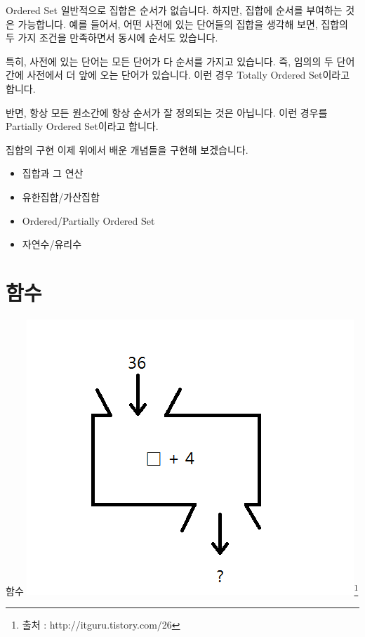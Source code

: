 \documentclass{beamer}
\begin{document}
\begin{frame}{Ordered Set}
일반적으로 집합은 순서가 없습니다. 하지만, 집합에 순서를 부여하는 것은 가능합니다. 예를 들어서, 어떤 사전에 있는 단어들의 집합을 생각해 보면, 집합의 두 가지 조건을 만족하면서 동시에 순서도 있습니다. 

특히, 사전에 있는 단어는 모든 단어가 다 순서를 가지고 있습니다. 즉, 임의의 두 단어간에 사전에서 더 앞에 오는 단어가 있습니다. 이런 경우 Totally Ordered Set이라고 합니다. 

반면, 항상 모든 원소간에 항상 순서가 잘 정의되는 것은 아닙니다. 이런 경우를 Partially Ordered Set이라고 합니다. 
\end{frame}





\begin{frame}{집합의 구현}
이제 위에서 배운 개념들을 구현해 보겠습니다. 
\begin{itemize}
\item 집합과 그 연산
\item 유한집합/가산집합 
\item Ordered/Partially Ordered Set 
\item 자연수/유리수
\end{itemize}
\end{frame}

\section{함수} 

\begin{frame}{함수}
\includegraphics[height=\textheight]{function}\footnote{출처 : http://itguru.tistory.com/26}
\end{frame}
\end{document}
